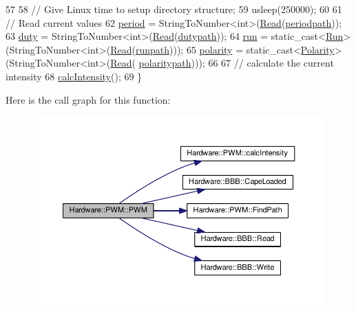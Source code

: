 \begin{DoxyCode}
57 
58   \textcolor{comment}{// Give Linux time to setup directory structure;}
59   usleep(250000);
60 
61   \textcolor{comment}{// Read current values}
62   \hyperlink{class_hardware_1_1_p_w_m_a91323a511e37d396f46d08f4159ef761}{period} = StringToNumber<int>(\hyperlink{class_hardware_1_1_b_b_b_a8b287ded7bcb2cfab361d1fca2b62e9f}{Read}(\hyperlink{class_hardware_1_1_p_w_m_a27e17a6c2e9720c571d5939f1a9ffb12}{periodpath}));
63   \hyperlink{class_hardware_1_1_p_w_m_a3309b2645c4c817384d91f33f0df5d64}{duty} = StringToNumber<int>(\hyperlink{class_hardware_1_1_b_b_b_a8b287ded7bcb2cfab361d1fca2b62e9f}{Read}(\hyperlink{class_hardware_1_1_p_w_m_a53311e9df6960751465d5f0b81192226}{dutypath}));
64   \hyperlink{class_hardware_1_1_p_w_m_a04531646b41accced24d46046c4bc7de}{run} = \textcolor{keyword}{static\_cast<}\hyperlink{class_hardware_1_1_p_w_m_a6f1e614731154a3613c03a4238ddd107}{Run}\textcolor{keyword}{>}(StringToNumber<int>(\hyperlink{class_hardware_1_1_b_b_b_a8b287ded7bcb2cfab361d1fca2b62e9f}{Read}(\hyperlink{class_hardware_1_1_p_w_m_ac1eb93467481ee2bd3565f1be47b8a01}{runpath})));
65   \hyperlink{class_hardware_1_1_p_w_m_ad346586d086f8462c3de6a4c19edb1d3}{polarity} = \textcolor{keyword}{static\_cast<}\hyperlink{class_hardware_1_1_p_w_m_a728111433109229b4da1efc953a107c1}{Polarity}\textcolor{keyword}{>}(StringToNumber<int>(\hyperlink{class_hardware_1_1_b_b_b_a8b287ded7bcb2cfab361d1fca2b62e9f}{Read}(
      \hyperlink{class_hardware_1_1_p_w_m_ace89c96484ffa9d6c9f3a8067848bf51}{polaritypath})));
66 
67   \textcolor{comment}{// calculate the current intensity}
68   \hyperlink{class_hardware_1_1_p_w_m_a891abdbbd00aae4f0a4afdf0a9e3a160}{calcIntensity}();
69 \}
\end{DoxyCode}


Here is the call graph for this function\+:\nopagebreak
\begin{figure}[H]
\begin{center}
\leavevmode
\includegraphics[width=350pt]{class_hardware_1_1_p_w_m_ac5608137ddc798aa26c505ec6edb8458_cgraph}
\end{center}
\end{figure}


